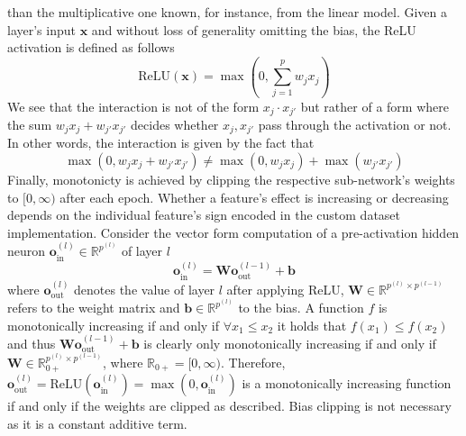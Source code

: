 \documentclass[twoside,11pt]{article}
\begin{document}
than the multiplicative one known, for instance, from the linear model.
Given a layer's input $\boldsymbol{x}$ and without loss of generality omitting the bias, the ReLU activation is defined as follows
\begin{equation}
  \text{ReLU}(\boldsymbol{x})=\max(0,\sum_{j=1}^p w_j x_j)
  \label{eq-our-extension-interaction-1}
\end{equation}
We see that the interaction is not of the form $x_j \cdot x_{j'}$ but rather of a form where the sum $w_j x_j+w_{j'} x_{j'}$ decides whether $x_j,x_{j'}$
pass through the activation or not.
In other words, the interaction is given by the fact that
\begin{equation}
  \max(0,w_j x_j + w_{j'} x_{j'})\neq\max(0,w_j x_j)+\max(w_{j'} x_{j'})
  \label{eq-our-extension-interaction-2}
\end{equation}
Finally, monotonicty is achieved by clipping the respective sub-network's weights to $[0,\infty)$ after each epoch. Whether a feature's effect is
increasing or decreasing depends on the individual feature's sign encoded in the custom dataset implementation.
Consider the vector form computation of a pre-activation hidden neuron $\boldsymbol{o}_{\text{in}}^{(l)}\in\mathbb{R}^{p^{(l)}}$ of layer $l$
\begin{equation}
  \boldsymbol{o}_{\text{in}}^{(l)}=\boldsymbol{W} \boldsymbol{o}_{\text{out}}^{(l-1)} + \boldsymbol{b}
  \label{eq-our-extension-monotonicity}
\end{equation}
where $\boldsymbol{o}_{\text{out}}^{(l)}$ denotes the value of layer $l$ after applying ReLU, $\boldsymbol{W}\in\mathbb{R}^{p^{(l)} \times p^{(l-1)}}$ refers to
the weight matrix and $\boldsymbol{b}\in\mathbb{R}^{p^{(l)}}$ to the bias.
A function $f$ is monotonically increasing if and only if $\forall x_1\le x_2$ it holds that $f(x_1)\le f(x_2)$ and thus
$\boldsymbol{W} \boldsymbol{o}_{\text{out}}^{(l-1)} + \boldsymbol{b}$ is clearly only monotonically increasing if and only if
$\boldsymbol{W}\in\mathbb{R}_{0+}^{p^{(l)}\times p^{(l-1)}}$, where $\mathbb{R}_{0+}=[0,\infty)$.
Therefore, $\boldsymbol{o}_{\text{out}}^{(l)}=\text{ReLU}(\boldsymbol{o}_{\text{in}}^{(l)})=\max(0,\boldsymbol{o}_{\text{in}}^{(l)})$ is a monotonically increasing
function if and only if the weights are clipped as described. Bias clipping is not necessary as it is a constant additive term.
\end{document}
